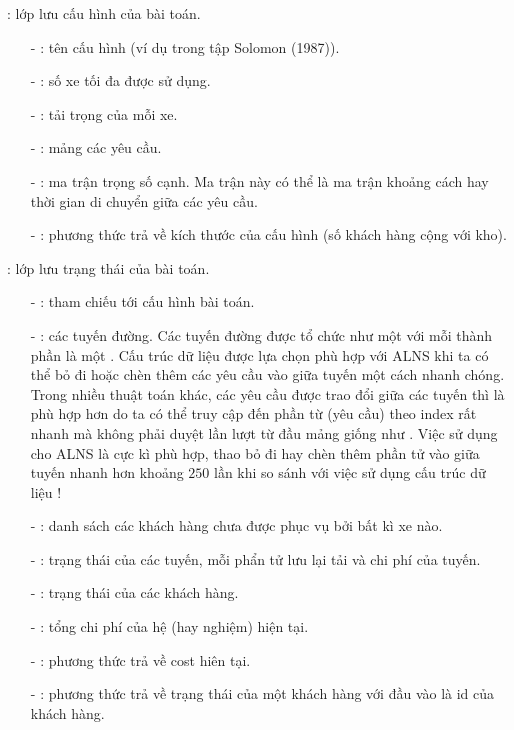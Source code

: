 : lớp lưu cấu hình của bài toán.
\begin{itemize}
	\item[-] : tên cấu hình (ví dụ  trong tập Solomon (1987)).
	\item[-] : số xe tối đa được sử dụng.
	\item[-] : tải trọng của mỗi xe.
	\item[-] : mảng các yêu cầu.
	\item[-] : ma trận trọng số cạnh. Ma trận này có thể là ma trận khoảng cách hay thời gian di chuyển giữa các yêu cầu.
	\item[-] : phương thức trả về kích thước của cấu hình (số khách hàng cộng với kho).
\end{itemize}

: lớp lưu trạng thái của bài toán.
\begin{itemize}
	\item[-] : tham chiếu tới cấu hình bài toán.
	\item[-] : các tuyến đường. Các tuyến đường được tổ chức như một  với mỗi thành phần là một . Cấu trúc dữ liệu  được lựa chọn phù hợp với ALNS khi ta có thể  bỏ đi hoặc chèn thêm các yêu cầu vào giữa tuyến một cách nhanh chóng. Trong nhiều thuật toán khác, các yêu cầu được trao đổi giữa các tuyến thì  là phù hợp hơn do ta có thể truy cập đến phần từ (yêu cầu) theo index rất nhanh mà không phải duyệt lần lượt từ đầu mảng giống như . Việc sử dụng  cho ALNS là cực kì phù hợp, thao bỏ đi hay chèn thêm phần tử vào giữa tuyến nhanh hơn khoảng $250$ lần khi so sánh với việc sử dụng cấu trúc dữ liệu !
	\item[-] : danh sách các khách hàng chưa được phục vụ bởi bất kì xe nào.
	\item[-] : trạng thái của các tuyến, mỗi phẩn tử lưu lại tải và chi phí của tuyến.
	\item[-] : trạng thái của các khách hàng.
	\item[-] : tổng chi phí của hệ (hay nghiệm) hiện tại.
	\item[-] : phương thức trả về cost hiên tại.
	\item[-] : phương thức trả về trạng thái của một khách hàng với đầu vào là id của khách hàng.
\end{itemize}